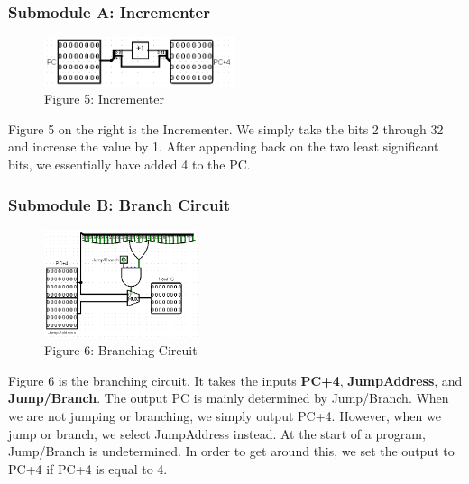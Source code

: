 \documentclass{article}
\begin{document}
\subsubsection{Submodule A: Incrementer}
\begin{figure}
\vspace{-1.4cm}
\begin{center}
\includegraphics[width=0.5\textwidth]{Incrementer.png}\\
Figure 5: Incrementer
\end{center}
\vspace{-13mm}
\end{figure}
Figure 5 on the right is the Incrementer. We simply take the bits 2 through 32 and increase the value by 1. After appending back on the two least significant bits, we essentially have added 4 to the PC.

\subsubsection{Submodule B: Branch Circuit}
\begin{figure}
\vspace{-1cm}
\begin{center}
\includegraphics[width=0.4\textwidth]{FetchBranch.png} \\
Figure 6: Branching Circuit
\end{center}
\vspace{-1cm}
\end{figure}
Figure 6 is the branching circuit. It takes the inputs \textbf{PC+4}, \textbf{JumpAddress}, and \textbf{Jump/Branch}. The output PC is mainly determined by Jump/Branch. When we are not jumping or branching, we simply output PC+4. However, when we jump or branch, we select JumpAddress instead. At the start of a program, Jump/Branch is undetermined. In order to get around this, we set the output to PC+4 if PC+4 is equal to 4.
\end{document}
